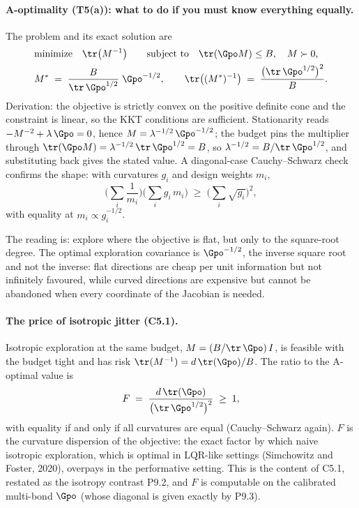 \paragraph{A-optimality (T5(a)): what to do if you must know everything
equally.}
The problem and its exact solution are
\begin{align*}
& \text{minimize} \quad \tr\big(M^{-1}\big)
\qquad \text{subject to} \quad \tr(\Gpo M) \le B, \quad M \succ 0, \\
& M^{*} \;=\; \frac{B}{\tr\,\Gpo^{1/2}}\;\Gpo^{-1/2},
\qquad
\tr\big((M^{*})^{-1}\big) \;=\; \frac{\big(\tr\,\Gpo^{1/2}\big)^{2}}{B}.
\end{align*}
Derivation: the objective is strictly convex on the positive definite cone
and the constraint is linear, so the KKT conditions are sufficient.
Stationarity reads $-M^{-2} + \lambda\,\Gpo = 0$, hence
$M = \lambda^{-1/2}\,\Gpo^{-1/2}$; the budget pins the multiplier through
$\tr(\Gpo M) = \lambda^{-1/2}\,\tr\,\Gpo^{1/2} = B$, so
$\lambda^{-1/2} = B/\tr\,\Gpo^{1/2}$, and substituting back gives the
stated value. A diagonal-case Cauchy--Schwarz check confirms the shape:
with curvatures $g_i$ and design weights $m_i$,
\begin{equation*}
\Big(\sum_i \frac{1}{m_i}\Big)\Big(\sum_i g_i\, m_i\Big)
\;\ge\; \Big(\sum_i \sqrt{g_i}\Big)^{2},
\end{equation*}
with equality at $m_i \propto g_i^{-1/2}$.

The reading is: explore where the objective is flat, but only to the
square-root degree. The optimal exploration covariance is $\Gpo^{-1/2}$,
the inverse square root and not the inverse: flat directions are cheap per
unit information but not infinitely favoured, while curved directions are
expensive but cannot be abandoned when every coordinate of the Jacobian is
needed.

\paragraph{The price of isotropic jitter (C5.1).}
Isotropic exploration at the same budget, $M = (B/\tr\,\Gpo)\,I$, is
feasible with the budget tight and has risk
$\tr(M^{-1}) = d\,\tr(\Gpo)/B$. The ratio to the A-optimal value is
\begin{equation*}
F \;=\; \frac{d\,\tr(\Gpo)}{\big(\tr\,\Gpo^{1/2}\big)^{2}} \;\ge\; 1,
\end{equation*}
with equality if and only if all curvatures are equal (Cauchy--Schwarz
again). $F$ is the curvature dispersion of the objective: the exact factor
by which naive isotropic exploration, which is optimal in LQR-like settings
(Simchowitz and Foster, 2020), overpays in the performative setting. This
is the content of C5.1, restated as the isotropy contrast P9.2, and $F$ is
computable on the calibrated multi-bond $\Gpo$ (whose diagonal is given
exactly by P9.3).

